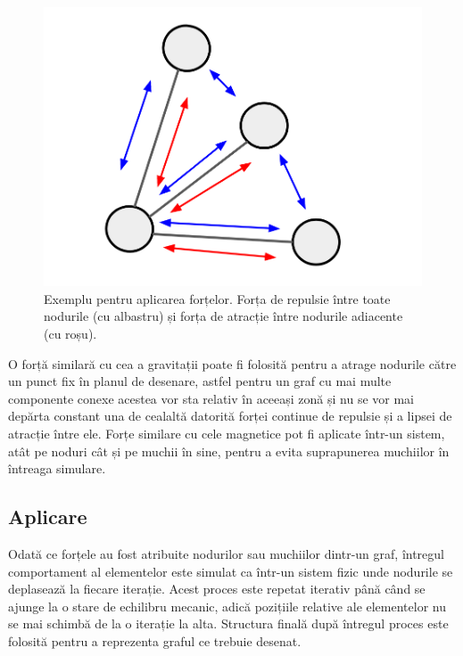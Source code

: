 \begin{figure}[H]
    \begin{center}
        \includegraphics[scale=0.3]{imagini/force/force.png}        
    \end{center}
    \caption{Exemplu pentru aplicarea forțelor. Forța de repulsie între toate nodurile (cu albastru) și forța de atracție între nodurile adiacente (cu roșu).}
    \label{fig:force}
\end{figure}

O forță similară cu cea a gravitații poate fi folosită pentru a atrage nodurile către un punct fix în planul de desenare, 
astfel pentru un graf cu mai multe componente conexe acestea vor sta relativ în aceeași zonă și nu se vor mai depărta 
constant una de cealaltă datorită forței continue de repulsie și a lipsei de atracție între ele. Forțe similare cu cele 
magnetice pot fi aplicate într-un sistem, atât pe noduri cât și pe muchii în sine, pentru a evita suprapunerea muchiilor 
în întreaga simulare. \cite{force2}\newline

\subsection{Aplicare}

Odată ce forțele au fost atribuite nodurilor sau muchiilor dintr-un graf, întregul comportament al elementelor 
este simulat ca într-un sistem fizic unde nodurile se deplasează la fiecare iterație. Acest proces este repetat 
iterativ până când se ajunge la o stare de echilibru mecanic, adică pozițiile relative ale elementelor nu se mai 
schimbă de la o iterație la alta. Structura finală după întregul proces este folosită pentru a reprezenta graful ce 
trebuie desenat.\newline

